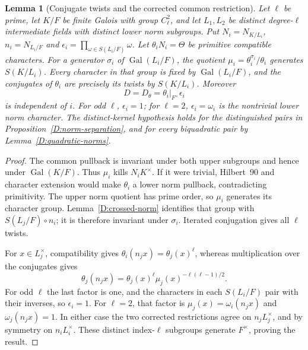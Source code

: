 \documentclass[11pt]{amsart}
\newtheorem{lemma}[theorem]{Lemma}
\theoremstyle{definition}
\theoremstyle{remark}
\newcommand{\Gal}{\operatorname{Gal}}
\begin{document}
\begin{lemma}[Conjugate twists and the corrected common restriction]
\label{U:determinant}\label{U:conjugacy}
Let $\ell$ be prime, let $K/F$ be finite Galois with group $C_\ell^2$,
and let $L_1,L_2$ be distinct degree-$\ell$ intermediate fields
with distinct lower norm subgroups. Put
$N_i=N_{K/L_i}$, $n_i=N_{L_i/F}$ and
$\epsilon_i=\prod_{\omega\in S(L_i/F)}\omega$.
Let $\theta_iN_i=\Theta$ be primitive compatible characters.
For a generator $\sigma_i$ of $\Gal(L_i/F)$, the quotient
$\mu_i=\theta_i^{\sigma_i}/\theta_i$ generates $S(K/L_i)$.
Every character in that group is fixed by $\Gal(L_i/F)$, and the conjugates of $\theta_i$
are precisely its twists by $S(K/L_i)$. Moreover
\begin{equation}\label{U:det-character}
 D=D_\theta=\theta_i|_{F^\times}\epsilon_i
\end{equation}
is independent of $i$. For odd $\ell$, $\epsilon_i=1$; for $\ell=2$,
$\epsilon_i=\omega_i$ is the nontrivial lower norm character.
The distinct-kernel hypothesis holds for the distinguished pairs in
Proposition~\ref{D:norm-separation}, and for every biquadratic pair by
Lemma~\ref{D:quadratic-norms}.
\end{lemma}
\begin{proof}
The common pullback is invariant under both upper subgroups and hence
under $\Gal(K/F)$. Thus $\mu_i$ kills $N_iK^\times$. If it were trivial,
Hilbert~90 and character extension would make $\theta_i$ a lower norm
pullback, contradicting primitivity. The upper norm quotient has prime
order, so $\mu_i$ generates its character group. Lemma~\ref{D:crossed-norm}
identifies that group with $S(L_j/F)\circ n_i$; it is therefore invariant
under $\sigma_i$. Iterated conjugation gives all $\ell$ twists.

For $x\in L_j^\times$, compatibility gives
$\theta_i(n_jx)=\theta_j(x)^\ell$, whereas multiplication over the
conjugates gives
\[
 \theta_j(n_jx)=\theta_j(x)^\ell
       \mu_j(x)^{-\ell(\ell-1)/2}.
\]
For odd $\ell$ the last factor is one, and the characters in each
$S(L_i/F)$ pair with their inverses, so $\epsilon_i=1$.
For $\ell=2$, that factor is
$\mu_j(x)=\omega_i(n_jx)$ and $\omega_j(n_jx)=1$.
In either case the two corrected restrictions agree on $n_jL_j^\times$,
and by symmetry on $n_iL_i^\times$. These distinct index-$\ell$
subgroups generate $F^\times$, proving the result.
\end{proof}
\end{document}
